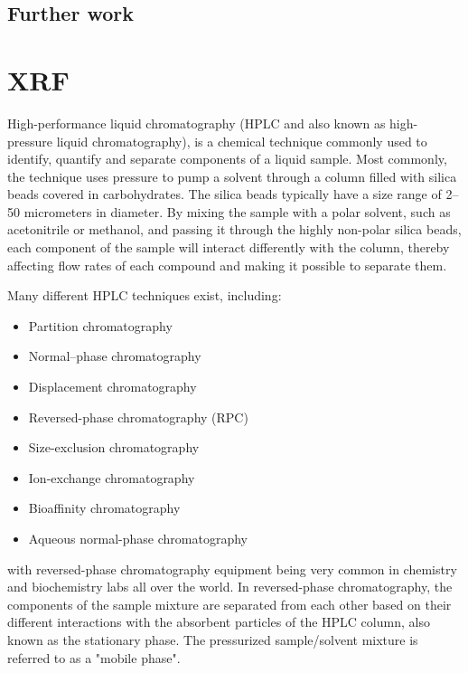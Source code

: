 \subsection{Further work}



\section{XRF}

\label{sec:hplc}
High-performance liquid chromatography (HPLC and also known as high-pressure liquid chromatography), is a chemical technique commonly used to identify, quantify and separate components of a liquid sample. Most commonly, the technique uses pressure to pump a solvent through a column filled with silica beads covered in carbohydrates. The silica beads typically have a size range of 2–50 micrometers in diameter. By mixing the sample with a polar solvent, such as acetonitrile or methanol, and passing it through the highly non-polar silica beads, each component of the sample will interact differently with the column, thereby affecting flow rates of each compound and making it possible to separate them. \cite{wiki_hplc}

Many different HPLC techniques exist, including:
\begin{itemize}
    \item Partition chromatography
    \item Normal–phase chromatography
    \item Displacement chromatography
    \item Reversed-phase chromatography (RPC)
    \item Size-exclusion chromatography
    \item Ion-exchange chromatography
    \item Bioaffinity chromatography
    \item Aqueous normal-phase chromatography
\end{itemize}
with reversed-phase chromatography equipment being very common in chemistry and biochemistry labs all over the world. In reversed-phase chromatography, the components of the sample mixture are separated from each other based on their different interactions with the absorbent particles of the HPLC column, also known as the stationary phase. The pressurized sample/solvent mixture is referred to as a "mobile phase".

